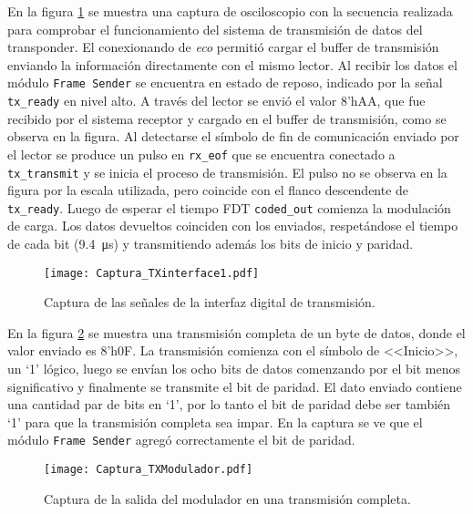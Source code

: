En la figura \ref{fig:CapturaTXinterface1} se muestra una captura de 
osciloscopio con la secuencia realizada para comprobar el 
funcionamiento del sistema de transmisión de datos del transponder. El 
conexionando de \emph{eco} permitió cargar el buffer de transmisión 
enviando la información directamente con el mismo lector. Al recibir 
los datos el módulo \lstinline{Frame Sender} se encuentra en estado de 
reposo, indicado por la señal \lstinline{tx_ready} en nivel alto. A 
través del lector se envió el valor 8'hAA, que fue recibido por el 
sistema receptor y cargado en el buffer de transmisión, como se 
observa en la figura. Al detectarse 
el símbolo de fin de comunicación enviado por el lector se produce un 
pulso en \lstinline{rx_eof} que se encuentra conectado a 
\lstinline{tx_transmit} y se inicia el proceso de transmisión. El pulso 
no se observa en la figura por la escala utilizada, pero coincide con el 
flanco descendente de \lstinline{tx_ready}. Luego de esperar el tiempo 
FDT \lstinline{coded_out} comienza la modulación de carga. Los datos 
devueltos coinciden con los enviados, respetándose el tiempo de cada 
bit (\SI{9.4}{\micro\second}) y transmitiendo además los bits de 
inicio y paridad.

\begin{figure}
	\centering
	\texttt{[image: Captura\_TXinterface1.pdf]}
	\caption{Captura de las señales de la interfaz digital de 
	transmisión.}%
	\label{fig:CapturaTXinterface1}
\end{figure}

En la figura \ref{fig:CapturaModuladorByte} se muestra una transmisión 
completa de un byte de datos, donde el valor enviado es 8'h0F. La 
transmisión comienza con el símbolo de <<Inicio>>, un `1' lógico, 
luego se envían los ocho bits de datos comenzando por el bit menos 
significativo y finalmente se transmite el bit de paridad. El dato 
enviado contiene una cantidad par de bits en `1', por lo tanto el bit 
de paridad debe ser también `1' para que la transmisión completa sea 
impar. En la captura se ve que el módulo \lstinline{Frame Sender} 
agregó correctamente el bit de paridad.

\begin{figure}
	\centering
	\texttt{[image: Captura\_TXModulador.pdf]}
	\caption{Captura de la salida del modulador en una transmisión 
	completa.}
	\label{fig:CapturaModuladorByte}
\end{figure}


